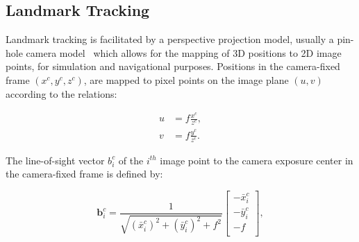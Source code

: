 






\subsection{Landmark Tracking}

Landmark tracking is facilitated by a perspective projection model, usually a
pin-hole camera model~\cite{Shuang2008} which allows for the mapping of 3D
positions to 2D image points, for simulation and navigational purposes.
Positions in the camera-fixed frame $(x^c, y^c, z^c)$, are mapped to pixel
points on the image plane $(u,v)$ according to the relations:

\begin{equation}
    \begin{aligned}
        u & =f\frac{x^c}{z^c}, \\
        v & =f\frac{y^c}{z^c}.
    \end{aligned}
\end{equation}

The line-of-sight vector $b_i^c$ of the $i^{th}$ image point to the camera
exposure center in the camera-fixed frame is defined by:

\begin{equation}
    \mathbf{b}_i^c=\frac{1}{\sqrt{(\bar{x}_i^c)^2+(\bar{y}_i^c)^2+f^2}}
    \begin{bmatrix}
        -\bar{x}^c_i \\
        -\bar{y}^c_i \\
        -f           \\
    \end{bmatrix},
\end{equation}

